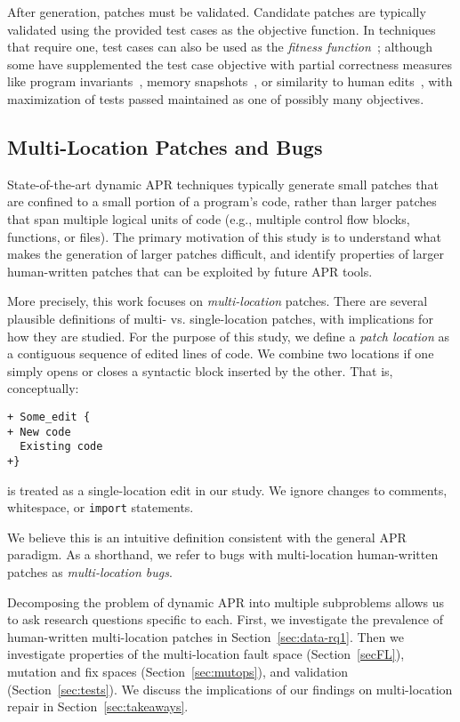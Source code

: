 \documentclass[10pt, conference]{IEEEtran}
\begin{document}
After generation, patches must be validated. Candidate patches are typically
validated using the provided test cases as the objective function. In techniques
that require one, test cases can also be used as the \emph{fitness
  function}~\cite{genprog}; although some have supplemented the test case
objective with partial correctness measures like program
invariants~\cite{dinglyu}, memory snapshots~\cite{source-code-checkpoint}, or
similarity to human edits~\cite{hdrepair}, with maximization of tests passed
maintained as one of possibly many objectives.


\subsection{Multi-Location Patches and Bugs}
State-of-the-art dynamic APR techniques typically generate small patches that
are confined to a small portion of a program's code, rather than larger patches
that span multiple logical units of code (e.g., multiple control flow blocks,
functions, or files). The primary motivation of this study is to understand what
makes the generation of larger patches difficult, and identify properties of
larger human-written patches that can be exploited by future APR tools.

More precisely, this work focuses on \emph{multi-location} patches. There are
several plausible definitions of multi- vs. single-location patches, with
implications for how they are studied. For the purpose of this study, we define
a \emph{patch location} as a contiguous sequence of edited lines of code.  We
combine two locations if one simply opens or closes a syntactic block inserted
by the other. That is, conceptually:
\begin{lstlisting}
+ Some_edit {
+ New code
  Existing code
+}
\end{lstlisting}
is treated as a single-location edit in our study. We ignore changes to
comments, whitespace, or \texttt{import} statements.

We believe this is an intuitive definition consistent with the general APR
paradigm. As a shorthand, we refer to bugs with multi-location human-written
patches as \emph{multi-location bugs}.

Decomposing the problem of dynamic APR into multiple subproblems allows us to
ask research questions specific to each. First, we investigate the prevalence of
human-written multi-location patches in Section~\ref{sec:data-rq1}.  Then we
investigate properties of the multi-location fault space (Section~\ref{secFL}),
mutation and fix spaces (Section~\ref{sec:mutops}), and validation
(Section~\ref{sec:tests}). We discuss the implications of our findings on
multi-location repair in Section~\ref{sec:takeaways}.
\end{document}
